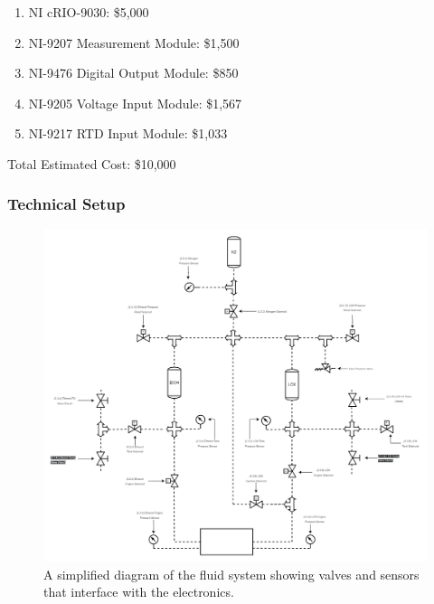     \begin{enumerate}
        \item NI cRIO-9030: \$5,000
        \item NI-9207 Measurement Module: \$1,500
        \item NI-9476 Digital Output Module: \$850
        \item NI-9205 Voltage Input Module: \$1,567
        \item NI-9217 RTD Input Module: \$1,033
    \end{enumerate}
    
    Total Estimated Cost: \$10,000 
        
    \subsubsection{Technical Setup}
    
        \begin{figure}[H]
            \centering
            \includegraphics[width=1\textwidth]{figures/fluidplan3_electrical_draft2.png}
            \caption{A simplified diagram of the fluid system showing valves and sensors that interface with the electronics.}
            \label{fig:fluid_elec}
        \end{figure}


